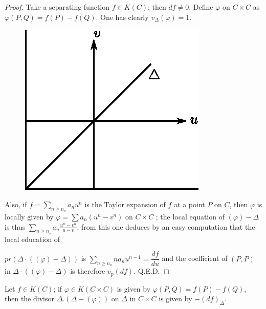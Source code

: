 \begin{proof}%
  Take a separating function $f \in K(C)$; then $df \ne 0$. Define
  $\varphi$ on $C \times C $ as $\varphi(P,Q) = f(P) - f(Q)$. One has
  clearly $v_\Delta(\varphi)=1$. 

\medskip
  \begin{minipage}{5.5cm}
    \begin{figure}[H]
      \centerline{\includegraphics{vol36-figures/fig36-5.eps}}
    \end{figure}
  \end{minipage}\quad 
  \begin{minipage}{4cm}
    Also, if $f= {\sum\limits_{n \ge n_o}
      a_n u^n}$ is the Taylor expansion of $f$ at a point $P$ on $C$,
    then $\varphi$ is locally given by $\varphi = \sum a_n (u^n - v^n)$
    on $C \times C $ ; the local equation of $(\varphi)-\Delta$
    is thus $\sum\limits_{n \geq n_\circ} a_n \frac{u^n - v^n}{u-v}$;
    from this one deduces by an easy computation that the local
    education of 
  \end{minipage}
\medskip  

\noindent $pr (\Delta \cdot ((\varphi) -\Delta))$ is 
  $ {\sum\limits_{n \geq n_o} na_n u^{n-1} = \dfrac{df}{du}}$\pageoriginale
  and the coefficient of $(P,P)$ in $\Delta \cdot ((\varphi )- \Delta)$ is
  therefore $v_ p (df)$. \phantom{WWWWWWWWWW}\hfill Q.E.D.
\end{proof}

\begin{coro*}%
  Let $f \in K(C)$; if $\varphi \in K(C \times C)$ is given by
  $\varphi(P,Q) = f(P) - f(Q)$, then the divisor $\Delta .(\Delta -
  (\varphi))$ on $\Delta$ in $C \times  C$ is given by $-(df)_\Delta
  $. 
\end{coro*}	
	

